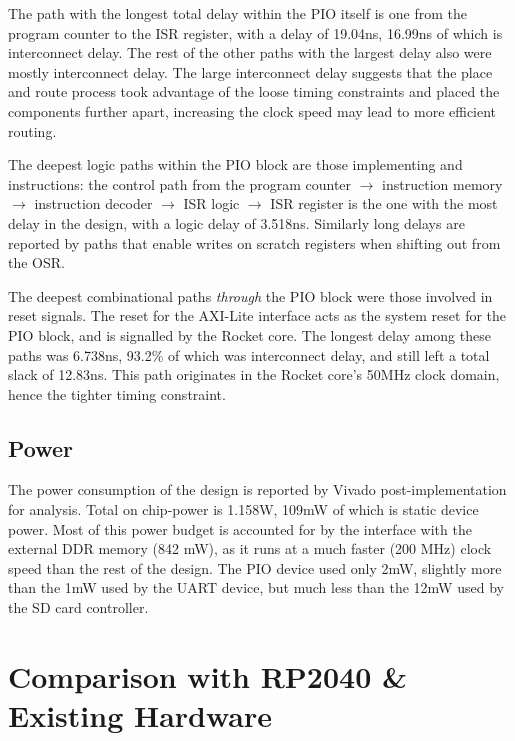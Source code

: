 The path with the longest total delay within the PIO itself is one from the program counter to the ISR register, with a delay of 19.04ns, 16.99ns of which is interconnect delay. The rest of the other paths with the largest delay also were mostly interconnect delay. The large interconnect delay suggests that the place and route process took advantage of the loose timing constraints and placed the components further apart, increasing the clock speed may lead to more efficient routing.

The deepest logic paths within the PIO block are those implementing  and  instructions: the control path from the program counter $\rightarrow$ instruction memory $\rightarrow$ instruction decoder $\rightarrow$ ISR logic $\rightarrow$ ISR register is the one with the most delay in the design, with a logic delay of 3.518ns. Similarly long delays are reported by paths that enable writes on scratch registers when shifting out from the OSR.

The deepest combinational paths \textit{through} the PIO block were those involved in reset signals. The reset for the AXI-Lite interface acts as the system reset for the PIO block, and is signalled by the Rocket core. The longest delay among these paths was 6.738ns, 93.2\% of which was interconnect delay, and still left a total slack of 12.83ns. This path originates in the Rocket core's 50MHz clock domain, hence the tighter timing constraint.

\subsection{Power}

The power consumption of the design is reported by Vivado post-implementation for analysis. Total on chip-power is 1.158W, 109mW of which is static device power. Most of this power budget is accounted for by the interface with the external DDR memory (842 mW), as it runs at a much faster (200 MHz) clock speed than the rest of the design. The PIO device used only 2mW, slightly more than the 1mW used by the UART device, but much less than the 12mW used by the SD card controller.

\section{Comparison with RP2040 \& Existing Hardware}

